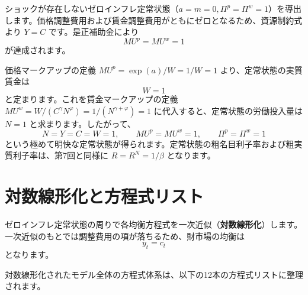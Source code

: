 \documentclass[
  japanese,
  lualatex,
  ja=standard,
  12pt,
  a4paper]{ltjsarticle}
\begin{document}
ショックが存在しないゼロインフレ定常状態（\(a=m=0, \Pi^p=\Pi^w=1\)）を導出します。価格調整費用および賃金調整費用がともにゼロとなるため、資源制約式より
\(Y=C\) です。是正補助金により \[
MU^p=MU^w=1
\] が達成されます。

価格マークアップの定義 \(MU^p = \exp(a)/W = 1/W = 1\)
より、定常状態の実質賃金は \[
W=1
\] と定まります。これを賃金マークアップの定義
\(MU^w = W/(C^\gamma N^\varphi) = 1/(N^{\gamma+\varphi}) = 1\)
に代入すると、定常状態の労働投入量は \(N=1\) と求まります。したがって、
\[
N=Y=C=W=1,
\qquad
MU^p=MU^w=1,
\qquad
\Pi^p=\Pi^w=1
\]
という極めて明快な定常状態が得られます。定常状態の粗名目利子率および粗実質利子率は、第7回と同様に
\(R=R^N=1/\beta\) となります。

\section{対数線形化と方程式リスト}\label{ux5bfeux6570ux7ddaux5f62ux5316ux3068ux65b9ux7a0bux5f0fux30eaux30b9ux30c8}

ゼロインフレ定常状態の周りで各均衡方程式を一次近似（\textbf{対数線形化}）します。一次近似のもとでは調整費用の項が落ちるため、財市場の均衡は
\[
y_t=c_t
\] となります。

対数線形化されたモデル全体の方程式体系は、以下の12本の方程式リストに整理されます。
\end{document}
